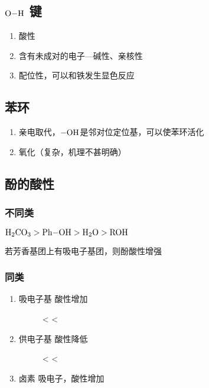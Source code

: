 \subsection{$\ce{O-H}$ 键}
\begin{enumerate}
    \item 酸性
    \item 含有未成对的电子---碱性、亲核性
    \item 配位性，可以和铁发生显色反应
\end{enumerate}

\subsection{苯环}
\begin{enumerate}
    \item 亲电取代，$\ce{-OH}$是邻对位定位基，可以使苯环活化
    \item 氧化（复杂，机理不甚明确）
\end{enumerate}

\subsection{酚的酸性}

\subsubsection{不同类}
$\ce{H2CO3} > \ce{Ph-OH} > \ce{H2O} > \ce{ROH}$

若芳香基团上有吸电子基团，则酚酸性增强

\subsubsection{同类}

\begin{enumerate}
    \item 吸电子基 酸性增加 \par
    \begin{figure}[H]
        \scriptsize
        \centering
         <  < 
    \end{figure}
    \item 供电子基 酸性降低 \par
    \begin{figure}[H]   
        \scriptsize
        \centering
         <  < 
    \end{figure}
    \item 卤素 吸电子，酸性增加
\end{enumerate}

